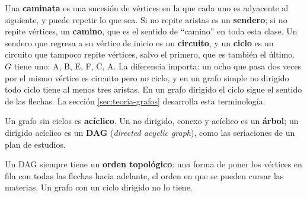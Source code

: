 \documentclass[11pt,letterpaper]{article}
\begin{document}
Una \textbf{caminata} es una sucesión de vértices en la que cada uno
es adyacente al siguiente, y puede repetir lo que sea. Si no repite
aristas es un \textbf{sendero}; si no repite vértices, un
\textbf{camino}, que es el sentido de ``camino'' en toda esta clase.
Un sendero que regresa a su vértice de inicio es un
\textbf{circuito}, y un \textbf{ciclo} es un circuito que tampoco
repite vértices, salvo el primero, que es también el último. $G$
tiene uno: A, B, E, F, C, A. La diferencia importa: un ocho que pasa
dos veces por el mismo vértice es circuito pero no ciclo, y en un
grafo simple no dirigido todo ciclo tiene al menos tres aristas. En
un grafo dirigido el ciclo sigue el sentido de las flechas. La
sección \ref{sec:teoria-grafos} desarrolla esta terminología.

Un grafo sin ciclos es \textbf{acíclico}. Un no dirigido, conexo y
acíclico es un \textbf{árbol}; un dirigido acíclico es un
\textbf{DAG} (\textit{directed acyclic graph}), como las seriaciones
de un plan de estudios.

\begin{center}
\end{center}

Un DAG siempre tiene un \textbf{orden topológico}: una forma de poner
los vértices en fila con todas las flechas hacia adelante, el orden en
que se pueden cursar las materias. Un grafo con un ciclo dirigido no
lo tiene.
\end{document}
